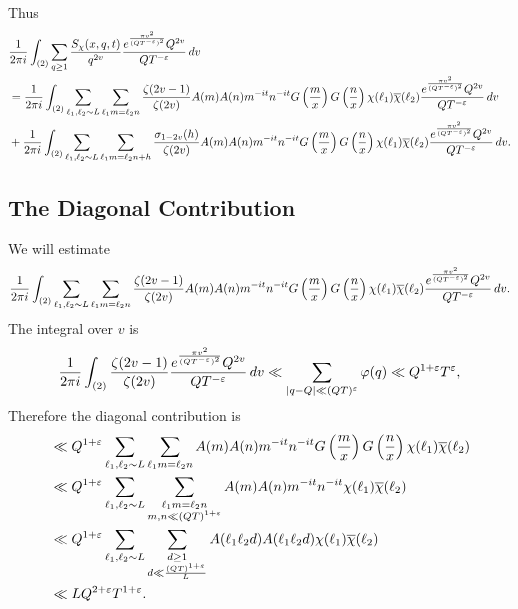 \documentclass[12pt,reqno,oneside]{amsart}
\begin{document}
    Thus
    \begin{align*}
      &\frac{1}{2\pi i}\int_{(2)}\sum_{q \ge 1}\frac{S_{\chi}(x,q,t)}{q^{2v}}\frac{e^{\frac{\pi v^{2}}{(QT^{-\varepsilon})^{2}}}Q^{2v}}{QT^{-\varepsilon}}\,dv \\
      &= \frac{1}{2\pi i}\int_{(2)}\sum_{\ell_{1},\ell_{2} \sim L}\sum_{\ell_{1}m = \ell_{2}n}\frac{\zeta(2v-1)}{\zeta(2v)}A(m)A(n)m^{-it}n^{-it}G\left(\frac{m}{x}\right)G\left(\frac{n}{x}\right)\chi(\ell_{1})\overline{\chi}(\ell_{2})\frac{e^{\frac{\pi v^{2}}{(QT^{-\varepsilon})^{2}}}Q^{2v}}{QT^{-\varepsilon}}\,dv \\
      &+\frac{1}{2\pi i}\int_{(2)}\sum_{\ell_{1},\ell_{2} \sim L}\sum_{\ell_{1}m = \ell_{2}n+h}\frac{\sigma_{1-2v}(h)}{\zeta(2v)}A(m)A(n)m^{-it}n^{-it}G\left(\frac{m}{x}\right)G\left(\frac{n}{x}\right)\chi(\ell_{1})\overline{\chi}(\ell_{2})\frac{e^{\frac{\pi v^{2}}{(QT^{-\varepsilon})^{2}}}Q^{2v}}{QT^{-\varepsilon}}\,dv.
    \end{align*}
  \subsection*{The Diagonal Contribution}
    We will estimate
    \[
      \frac{1}{2\pi i}\int_{(2)}\sum_{\ell_{1},\ell_{2} \sim L}\sum_{\ell_{1}m = \ell_{2}n}\frac{\zeta(2v-1)}{\zeta(2v)}A(m)A(n)m^{-it}n^{-it}G\left(\frac{m}{x}\right)G\left(\frac{n}{x}\right)\chi(\ell_{1})\overline{\chi}(\ell_{2})\frac{e^{\frac{\pi v^{2}}{(QT^{-\varepsilon})^{2}}}Q^{2v}}{QT^{-\varepsilon}}\,dv.
    \]
    The integral over $v$ is
    \[
      \frac{1}{2\pi i}\int_{(2)}\frac{\zeta(2v-1)}{\zeta(2v)}\frac{e^{\frac{\pi v^{2}}{(QT^{-\varepsilon})^{2}}}Q^{2v}}{QT^{-\varepsilon}}\,dv \ll \sum_{|q-Q| \ll (QT)^{\varepsilon}}\varphi(q) \ll Q^{1+\varepsilon}T^{\varepsilon},
    \]
    Therefore the diagonal contribution is
    \begin{align*}
      &\ll Q^{1+\varepsilon}\sum_{\ell_{1},\ell_{2} \sim L}\sum_{\ell_{1}m = \ell_{2}n}A(m)A(n)m^{-it}n^{-it}G\left(\frac{m}{x}\right)G\left(\frac{n}{x}\right)\chi(\ell_{1})\overline{\chi}(\ell_{2}) \\
      &\ll Q^{1+\varepsilon}\sum_{\ell_{1},\ell_{2} \sim L}\sum_{\substack{\ell_{1}m = \ell_{2}n \\ m,n \ll (QT)^{1+\varepsilon}}}A(m)A(n)m^{-it}n^{-it}\chi(\ell_{1})\overline{\chi}(\ell_{2}) \\
      &\ll Q^{1+\varepsilon}\sum_{\ell_{1},\ell_{2} \sim L}\sum_{\substack{d \ge 1 \\ d \ll \frac{(QT)^{1+\varepsilon}}{L}}}A(\ell_{1}\ell_{2}d)A(\ell_{1}\ell_{2}d)\chi(\ell_{1})\overline{\chi}(\ell_{2}) \\
      &\ll LQ^{2+\varepsilon}T^{1+\varepsilon}.
    \end{align*}
\end{document}
